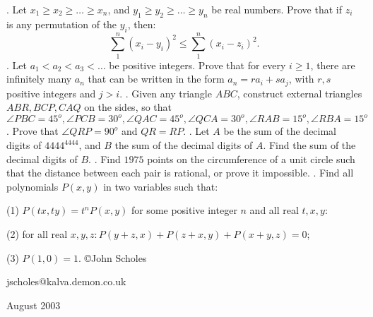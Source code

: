 \nopagenumbers
{}
\vskip 25pt
. Let $x_1\ge x_2\ge\ldots\ge x_n$, and $y_1\ge y_2\ge\ldots\ge y_n$ be real numbers. Prove that if $z_i$ is any permutation of the $y_i$, then: $$\sum_1^n(x_i-y_i)^2\le\sum_1^n(x_i-z_i)^2.$$
\vskip 12pt
. Let $a_1<a_2<a_3<\ldots$ be positive integers. Prove that for every $i\ge1$, there are infinitely many $a_n$ that can be written in the form $a_n=ra_i+sa_j$, with $r,s$ positive integers and $j>i$.
\vskip 12pt
. Given any triangle $ABC$, construct external triangles $ABR,BCP,CAQ$ on the sides, so that $\angle PBC=45^o,\angle PCB=30^o,\angle QAC=45^o,\angle QCA=30^o,\angle RAB=15^o,\angle RBA=15^o$. Prove that $\angle QRP=90^o$ and $QR=RP$.
\vskip 12pt
. Let $A$ be the sum of the decimal digits of $4444^{4444}$, and $B$ the sum of the decimal digits of $A$. Find the sum of the decimal digits of $B$.
\vskip 12pt
. Find $1975$ points on the circumference of a unit circle such that the distance between each pair is rational, or prove it impossible.
\vskip 12pt
. Find all polynomials $P(x,y)$ in two variables such that:

(1) $P(tx,ty)=t^nP(x,y)$ for some positive integer $n$ and all real $t,x,y$:

(2) for all real $x,y,z: P(y+z,x)+P(z+x,y)+P(x+y,z)=0$;

(3) $P(1,0)=1$.
\vskip 20pt
\noindent \copyright John Scholes

\noindent jscholes@kalva.demon.co.uk

 August 2003

\bye
